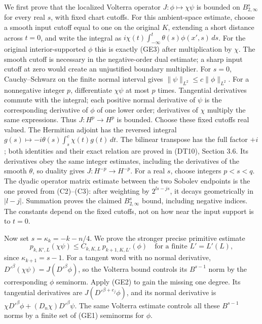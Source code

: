 \documentclass[
  11pt,
]{article}
\begin{document}
We first prove that the localized Volterra operator
\(J:\phi\mapsto\chi\psi\) is bounded on \(B^s_{2,\infty}\) for every
real \(s\), with fixed chart cutoffs. For this ambient-space estimate,
choose a smooth input cutoff equal to one on the original \(K\),
extending a short distance across \(t=0\), and write the integral as
\(i\chi(t)\int_{-\infty}^{t}\theta(s)\phi(x',s)\,ds\). For the original
interior-supported \(\phi\) this is exactly (GE3) after multiplication
by \(\chi\). The smooth cutoff is necessary in the negative-order dual
estimate; a sharp input cutoff at zero would create an unjustified
boundary multiplier. For \(s=0\), Cauchy--Schwarz on the finite normal
interval gives \(\|\psi\|_{L^2}\le c\|\phi\|_{L^2}\). For a nonnegative
integer \(p\), differentiate \(\chi\psi\) at most \(p\) times.
Tangential derivatives commute with the integral; each positive normal
derivative of \(\psi\) is the corresponding derivative of \(\phi\) of
one lower order; derivatives of \(\chi\) multiply the same expressions.
Thus \(J:H^p\to H^p\) is bounded. Choose these fixed cutoffs real
valued. The Hermitian adjoint has the reversed integral
\(g(s)\mapsto-i\theta(s)\int_s^c\chi(t)g(t)\,dt\). The bilinear
transpose has the full factor \(+i\); both identities and their exact
relation are proved in (DT10), Section 3.6. Its derivatives obey the
same integer estimates, including the derivatives of the smooth
\(\theta\), so duality gives \(J:H^{-p}\to H^{-p}\). For a real \(s\),
choose integers \(p<s<q\). The dyadic operator matrix estimate between
the two Sobolev endpoints is the one proved from (C2)--(C3): after
weighting by \(2^{ls-js}\), it decays geometrically in \(|l-j|\).
Summation proves the claimed \(B^s_{2,\infty}\) bound, including
negative indices. The constants depend on the fixed cutoffs, not on how
near the input support is to \(t=0\).

Now set \(s=\kappa_k=-k-n/4\). We prove the stronger precise primitive
estimate \[
 p_{k,K',L}(\chi\psi)
 \le C_{k,K,L}\,p_{k+1,K,L'}(\phi)
 \quad\text{for a finite }L'=L'(L),
 \tag{GE4}
\] since \(\kappa_{k+1}=s-1\). For a tangent word with no normal
derivative, \(D'^\beta(\chi\psi)=J(D'^\beta\phi)\), so the Volterra
bound controls its \(B^{s-1}\) norm by the corresponding \(\phi\)
seminorm. Apply (GE2) to gain the missing one degree. Its tangential
derivatives are \(J(D'^{\beta+e_j}\phi)\), and its normal derivative is
\(\chi D'^\beta\phi+(D_n\chi)D'^\beta\psi\). The same Volterra estimate
controls all these \(B^{s-1}\) norms by a finite set of (GE1) seminorms
for \(\phi\).
\end{document}
